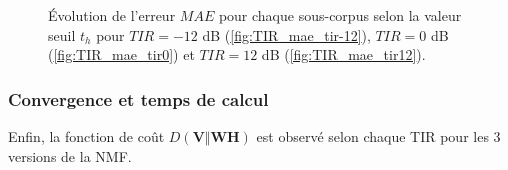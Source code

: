 \begin{figure}%
\centering
{}%
\qquad
{}%
\qquad
{}%
\caption{Évolution de l'erreur $MAE$ pour chaque sous-corpus selon la valeur seuil $t_h$ pour $TIR = -12$ dB (\ref{fig:TIR_mae_tir-12}), $TIR = 0$ dB (\ref{fig:TIR_mae_tir0}) et $TIR = 12$ dB (\ref{fig:TIR_mae_tir12}).}
\label{fig:TIR_mae}
\end{figure}

\subsubsection{Convergence et temps de calcul}
Enfin, la fonction de coût $D(\mathbf{V}\Vert \mathbf{WH})$ est observé selon chaque TIR pour les 3 versions de la NMF.

